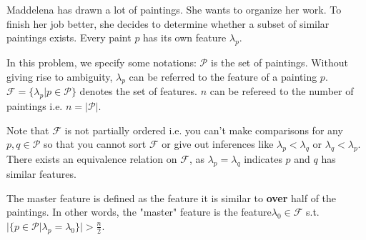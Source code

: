 
Maddelena has drawn a lot of paintings. She wants to organize her work. To finish her job better, she decides to determine whether a subset of similar paintings exists. Every paint $p$ has its own feature $\lambda_p$. 

In this problem, we specify some notations: $\mathcal{P}$ is the set of paintings. Without giving rise to ambiguity, $\lambda_p$ can be referred to the feature of a painting $p$. $\mathcal{F} = \{\lambda_p|p\in \mathcal{P}\}$ denotes the set of features. $n$ can be refereed to the number of paintings i.e. $n=\left|\mathcal{P}\right|$.

Note that $\mathcal{F}$ is not partially ordered i.e. you can't make comparisons for any $p,q\in \mathcal{P}$ so that you cannot sort $\mathcal{F}$ or give out inferences like $\lambda_p<\lambda_q$ or $\lambda_q<\lambda_p$. There exists an equivalence relation on $\mathcal{F}$, as $\lambda_p = \lambda_q$ indicates $p$ and $q$ has similar features.

The master feature is defined as the feature it is similar to \textbf{over} half of the paintings. 
In other words, the "master" feature is the feature$\lambda_0\in \mathcal{F}$ s.t. $|\{p\in\mathcal{P}|\lambda_p = \lambda_0\}|>\frac n2$.

